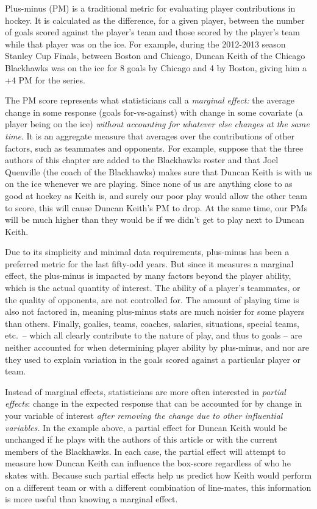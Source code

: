 Plus-minus (PM) is a traditional metric for evaluating player contributions in
hockey. It is calculated as the difference, for a given player, between the
number of goals scored against the player's team and those scored by the
player's team while that player was on the ice.  For example, during the
2012-2013 season Stanley Cup Finals, between Boston and Chicago, Duncan Keith
of the Chicago Blackhawks was on the ice for 8 goals by Chicago and 4 by
Boston, giving him a +4 PM for the series.

The PM score represents what statisticians call a \textit{marginal effect:}
the average change in some response (goals for-vs-against) with change in some
covariate (a player being on the ice) \textit{without accounting for whatever
else changes at the same time}. It is an aggregate measure that averages over
the contributions of other factors, such as teammates and opponents.   For
example, suppose that the three authors of this chapter are added to the
Blackhawks roster and that Joel Quenville (the coach of the Blackhawks) makes
sure that Duncan Keith is with us on the ice whenever we are playing.  Since
none of us are anything close to as good at hockey as Keith is, and surely our
poor play would allow the other team to score, this will cause Duncan Keith's
PM to drop.  At the same time, our PMs will be much higher than they would be
if we didn't get to play next to Duncan Keith.

Due to its simplicity and minimal data requirements, plus-minus has been a
preferred metric for the last fifty-odd years.  But since it measures a
marginal effect, the plus-minus is impacted by many factors beyond the player
ability, which is the actual quantity of interest.  The ability of a player's
teammates, or the quality of opponents, are not controlled for.  The amount of
playing time is also not factored in, meaning plus-minus stats are much
noisier for some players than others. Finally, goalies, teams, coaches,
salaries, situations, special teams, etc.~-- which all clearly contribute to
the nature of play, and thus to goals -- are neither accounted for when
determining player ability by plus-minus, and nor are they used to explain
variation in the goals scored against a particular player or team.

Instead of marginal effects, statisticians are more often interested in
\textit{partial effects}: change in the expected response that can be
accounted for by change in your variable of interest \textit{after removing
the change due to other influential variables.} In the example above, a
partial effect for Duncan Keith would be unchanged if he plays with the
authors of this article or with the current members of the Blackhawks.  In
each case, the partial effect will attempt to measure how Duncan Keith can
influence the box-score regardless of who he skates with. Because such partial
effects help us predict how Keith would perform on a different team or with a
different combination of line-mates, this information is more useful than
knowing a marginal effect.

